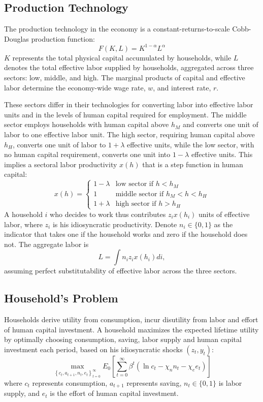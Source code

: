 \documentclass[12pt]{article}
\begin{document}
\subsection{Production Technology}
The production technology in the economy is a constant-returns-to-scale Cobb-Douglas production function:
\begin{equation}
    F(K,L)=K^{1-\alpha} L^{\alpha}
\end{equation}
$K$ represents the total physical capital accumulated by households, while $L$ denotes the total effective labor supplied by households, aggregated across three sectors: low, middle, and high. The marginal products of capital and effective labor determine the economy-wide wage rate, $w$, and interest rate, $r$.

These sectors differ in their technologies for converting labor into effective labor units and in the levels of human capital required for employment. 
The middle sector employs households with human capital above $h_M$ and converts one unit of labor to one effective labor unit. The high sector, requiring human capital above $h_H$, converts one unit of labor to $1+\lambda$ effective units, while the low sector, with no human capital requirement, converts one unit into $1-\lambda$ effective units. This implies a sectoral labor productivity $x(h)$ that is a step function in human capital:
\begin{equation}
    \label{eq:x}
x(h)=\left \{ 
\begin{array}{cl}
1-\lambda  & \text{low sector if }h<h_{M} \\ 
1 & \text{middle sector if }h_{M}<h<h_{H} \\ 
1+\lambda  & \text{high sector if }h>h_{H}%
\end{array}%
\right. 
\end{equation}
A household $i$ who decides to work thus contributes $z_ix(h_i)$ units of effective labor, where $z_i$ is his idiosyncratic productivity. Denote $n_i \in \{0,1\}$ as the indicator that takes one if the household works and zero if the household does not. The aggregate labor is
\begin{equation}
    L=\int n_iz_ix(h_i)di,
\end{equation}
assuming perfect substitutability of effective labor across the three sectors.

\subsection{Household's Problem}
Households derive utility from consumption, incur disutility from labor and effort of human capital investment. 
A household maximizes the expected lifetime utility by optimally choosing consumption, saving, labor supply and human capital investment each period, based on his idiosyncratic shocks $(z_t,y_t)$:
\begin{equation}
\max_{\left \{ c_t,a_{t+1},n_t,e_t\right \}_{t=0}^{\infty }}E_0\left[
\sum\limits_{t=0}^{\infty }\beta^t( \ln c_t-\chi_n n_t-\chi_e e_t ) \right] 
\end{equation}
where $c_t$ represents consumption, $a_{t+1}$ represents saving, $n_t \in \{0,1\}$ is labor supply, and $e_t$ is the effort of human capital investment.
\end{document}
